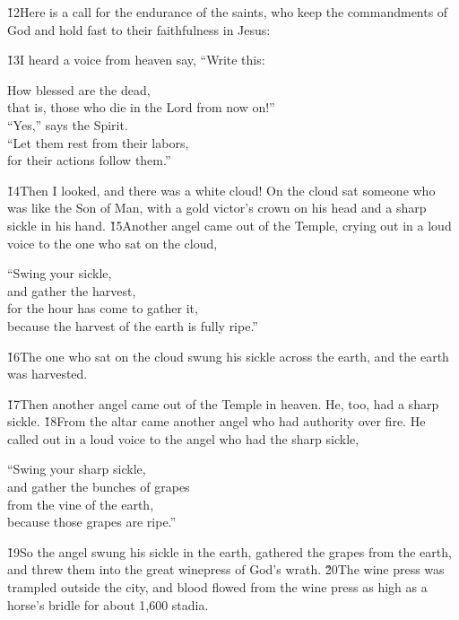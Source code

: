 \v{12}Here is a call for the endurance of the saints, who keep the commandments of God and hold fast to their faithfulness in Jesus:

\v{13}I heard a voice from heaven say, ``Write this:

\begin{poetry}
\poeml How blessed are the dead, \\
\poemll    that is, those who die in the Lord from now on!'' \\
\poeml ``Yes,'' says the Spirit. \\
\poemll    ``Let them rest from their labors, \\
\poemlll       for their actions follow them.''
\end{poetry}

\v{14}Then I looked, and there was a white cloud! On the cloud sat someone who was like the Son of Man, with a gold victor's crown on his head and a sharp sickle in his hand. \v{15}Another angel came out of the Temple, crying out in a loud voice to the one who sat on the cloud,

\begin{poetry}
\poeml ``Swing your sickle, \\
\poemll    and gather the harvest, \\
\poeml for the hour has come to gather it, \\
\poemll    because the harvest of the earth is fully ripe.''
\end{poetry}

\v{16}The one who sat on the cloud swung his sickle across the earth, and the earth was harvested.

\v{17}Then another angel came out of the Temple in heaven. He, too, had a sharp sickle. \v{18}From the altar came another angel who had authority over fire. He called out in a loud voice to the angel who had the sharp sickle,

\begin{poetry}
\poeml ``Swing your sharp sickle, \\
\poemll    and gather the bunches of grapes \\
\poeml from the vine of the earth, \\
\poemll    because those grapes are ripe.''
\end{poetry}

\v{19}So the angel swung his sickle in the earth, gathered the grapes from the earth, and threw them into the great winepress of God's wrath. \v{20}The wine press was trampled outside the city, and blood flowed from the wine press as high as a horse's bridle for about 1,600 stadia.

